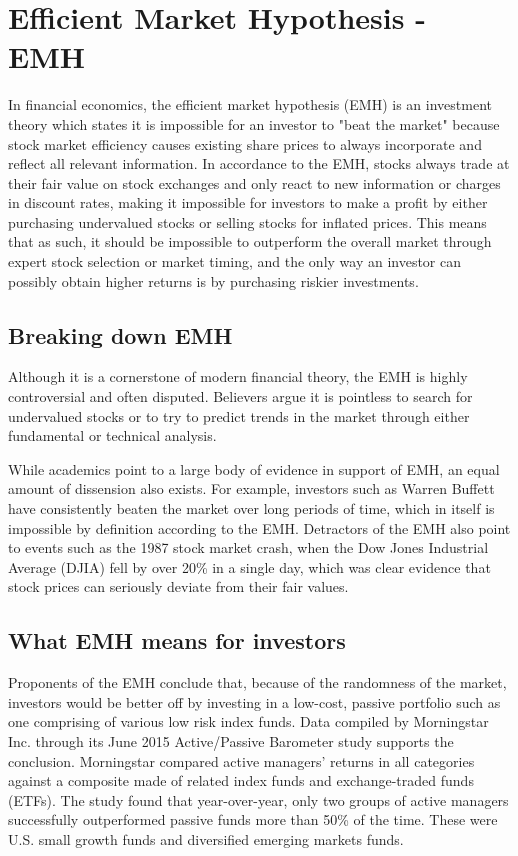 \section{Efficient Market Hypothesis - EMH}

In financial economics, the efficient market hypothesis (EMH) is an investment theory which states it is impossible for an investor to "beat the market" because stock market efficiency causes existing share prices to always incorporate and reflect all relevant information. In accordance to the EMH, stocks always trade at their fair value on stock exchanges and only react to new information or charges in discount rates, making it impossible for investors to make a profit by either purchasing undervalued stocks or selling stocks for inflated prices. This means that as such, it should be impossible to outperform the overall market through expert stock selection or market timing, and the only way an investor can possibly obtain higher returns is by purchasing riskier investments.

\subsection{Breaking down EMH}
Although it is a cornerstone of modern financial theory, the EMH is highly controversial and often disputed. Believers argue it is pointless to search for undervalued stocks or to try to predict trends in the market through either fundamental or technical analysis.

While academics point to a large body of evidence in support of EMH, an equal amount of dissension also exists. For example, investors such as Warren Buffett have consistently beaten the market over long periods of time, which  in itself is impossible by definition according to the EMH. Detractors of the EMH also point to events such as the 1987 stock market crash, when the Dow Jones Industrial Average (DJIA) fell by over 20\% in a single day, which was clear evidence that stock prices can seriously deviate from their fair values.

\subsection{What EMH means for investors}
Proponents of the EMH conclude that, because of the randomness of the market, investors would be better off by investing in a low-cost, passive portfolio such as one comprising of various low risk index funds. Data compiled by Morningstar Inc. through its June 2015 Active/Passive Barometer study supports the conclusion. Morningstar compared active managers’ returns in all categories against a composite made of related index funds and exchange-traded funds (ETFs). The study found that year-over-year, only two groups of active managers successfully outperformed passive funds more than 50\% of the time. These were U.S. small growth funds and diversified emerging markets funds.

